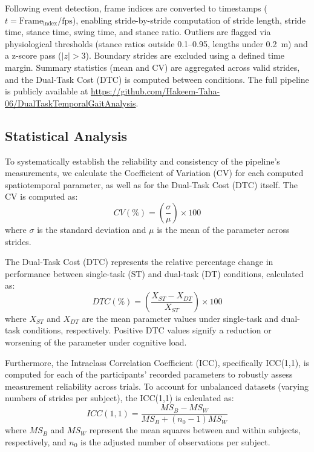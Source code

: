 \documentclass[conference]{IEEEtran}
\begin{document}
Following event detection, frame indices are converted to timestamps ($t = \text{Frame}_{\text{index}} / \text{fps}$), enabling stride-by-stride computation of stride length, stride time, stance time, swing time, and stance ratio. Outliers are flagged via physiological thresholds (stance ratios outside 0.1–0.95, lengths under 0.2~m) and a z-score pass ($|z| > 3$). Boundary strides are excluded using a defined time margin. Summary statistics (mean and CV) are aggregated across valid strides, and the Dual-Task Cost (DTC) is computed between conditions. The full pipeline is publicly available at \url{https://github.com/Hakeem-Taha-06/DualTaskTemporalGaitAnalysis}.

\subsection{Statistical Analysis}
To systematically establish the reliability and consistency of the pipeline's measurements, we calculate the Coefficient of Variation (CV) for each computed spatiotemporal parameter, as well as for the Dual-Task Cost (DTC) itself. The CV is computed as:
\begin{equation}
CV (\%) = \left( \frac{\sigma}{\mu} \right) \times 100
\end{equation}
where $\sigma$ is the standard deviation and $\mu$ is the mean of the parameter across strides.

The Dual-Task Cost (DTC) represents the relative percentage change in performance between single-task (ST) and dual-task (DT) conditions, calculated as:
\begin{equation}
DTC (\%) = \left( \frac{X_{ST} - X_{DT}}{X_{ST}} \right) \times 100
\end{equation}
where $X_{ST}$ and $X_{DT}$ are the mean parameter values under single-task and dual-task conditions, respectively. Positive DTC values signify a reduction or worsening of the parameter under cognitive load.

Furthermore, the Intraclass Correlation Coefficient (ICC), specifically ICC(1,1), is computed for each of the participants' recorded parameters to robustly assess measurement reliability across trials. To account for unbalanced datasets (varying numbers of strides per subject), the ICC(1,1) is calculated as:
\begin{equation}
ICC(1,1) = \frac{MS_B - MS_W}{MS_B + (n_0 - 1)MS_W}
\end{equation}
where $MS_B$ and $MS_W$ represent the mean squares between and within subjects, respectively, and $n_0$ is the adjusted number of observations per subject. 
\end{document}
